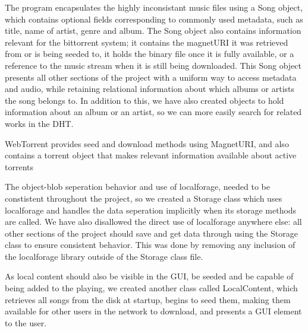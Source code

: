 The program encapsulates the highly inconsistant music files using a Song object,
which contains optional fields corresponding to commonly used metadata, 
such as title, name of artist, genre and album. 
The Song object also contains information relevant for the bittorrent system; 
it contains the magnetURI it was retrieved from or is being seeded to, 
it holds the binary file once it is fully available, 
or a reference to the music stream when it is still being downloaded.
This Song object presents all other sections of the project with a uniform way to access metadata and audio, 
while retaining relational information about which albums or artists the song belongs to. In addition to this, 
we have also created objects to hold information about an album or an artist, 
so we can more easily search for related works in the DHT.
\newline

WebTorrent provides seed and download methods using MagnetURI,
and also contains a torrent object that makes relevant information available about active torrents
\newline

The object-blob seperation behavior and use of localforage,
needed to be constistent throughout the project, 
so we created a Storage class which uses localforage and handles the data seperation implicitly when its storage methods are called.
We have also disallowed the direct use of localforage anywhere else: all other sections of the project should save and get data through using the Storage class to ensure consistent behavior. 
This was done by removing any inclusion of the localforage library outside of the Storage class file.

As local content should also be visible in the GUI, 
be seeded and be capable of being added to the playing,
we created another class called LocalContent,
which retrieves all songs from the disk at startup,
begins to seed them, making them available for other users in the network to download,
and presents a GUI element to the user.
